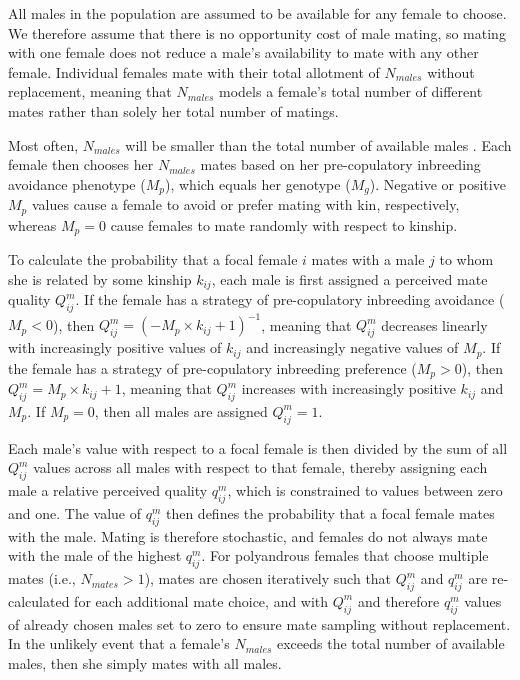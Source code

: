 \documentclass[12pt]{article}
\begin{document}
All males in the population are assumed to be available for any female to choose. We therefore assume that there is no opportunity cost of male mating, so mating with one female does not reduce a male's availability to mate with any other female. Individual females mate with their total allotment of $N_{males}$ without replacement, meaning that $N_{males}$ models a female's total number of different mates rather than solely her total number of matings.

Most often, $N_{males}$ will be smaller than the total number of available males \cite[][]{Duthie}. Each female then chooses her $N_{males}$ mates based on her pre-copulatory inbreeding avoidance phenotype ($M_{p}$), which equals her genotype ($M_{g}$). Negative or positive $M_{p}$ values cause a female to avoid or prefer mating with kin, respectively, whereas $M_{p}=0$ cause females to mate randomly with respect to kinship.

To calculate the probability that a focal female $i$ mates with a male $j$ to whom she is related by some kinship $k_{ij}$, each male is first assigned a perceived mate quality $Q^{m}_{ij}$. If the female has a strategy of pre-copulatory inbreeding avoidance ($M_{p}<0$), then $Q^{m}_{ij} = (-M_{p} \times k_{ij} + 1)^{-1}$, meaning that $Q^{m}_{ij}$ decreases linearly with increasingly positive values of $k_{ij}$ and increasingly negative values of $M_{p}$. If the female has a strategy of pre-copulatory inbreeding preference ($M_{p}>0$), then $Q^{m}_{ij} = M_{p} \times k_{ij} + 1$, meaning that $Q^{m}_{ij}$ increases with increasingly positive $k_{ij}$ and $M_{p}$. If $M_{p}=0$, then all males are assigned $Q^{m}_{ij}=1$.

Each male's value with respect to a focal female is then divided by the sum of all $Q^{m}_{ij}$ values across all males with respect to that female, thereby assigning each male a relative perceived quality $q^{m}_{ij}$, which is constrained to values between zero and one. The value of $q^{m}_{ij}$ then defines the probability that a focal female mates with the male. Mating is therefore stochastic, and females do not always mate with the male of the highest $q^{m}_{ij}$. For polyandrous females that choose multiple mates (i.e., $N_{mates}>1$), mates are chosen iteratively such that $Q^{m}_{ij}$ and $q^{m}_{ij}$ are re-calculated for each additional mate choice, and with $Q^{m}_{ij}$ and therefore $q^{m}_{ij}$ values of already chosen males set to zero to ensure mate sampling without replacement. In the unlikely event that a female's $N_{males}$ exceeds the total number of available males, then she simply mates with all males.
\end{document}
